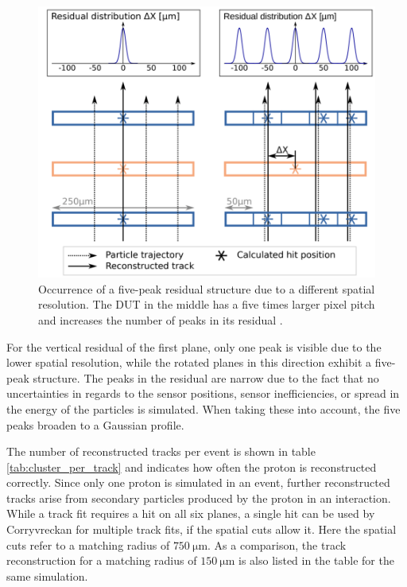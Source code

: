 \begin{figure}
  \centering
  \includegraphics[height=0.6\textwidth]{images/peaks.png}
  \caption{Occurrence of a five-peak residual structure due to a different spatial resolution. The DUT in the middle
  has a five times larger pixel pitch and increases the number of peaks in its residual \cite{peaks}.}
  \label{fig:peaks}
\end{figure}

For the vertical residual of the first plane, only one peak is visible due to the lower spatial resolution, while the rotated planes
in this direction exhibit a five-peak structure. The peaks in the residual are narrow due to the fact that no uncertainties in regards
to the sensor positions, sensor inefficiencies, or spread in the energy of the particles is simulated. When taking these into account, the
five peaks broaden to a Gaussian profile.

The number of reconstructed tracks per event is shown in table \ref{tab:cluster_per_track} and indicates how often the proton is
reconstructed correctly. Since only one proton is simulated in an event, further reconstructed tracks arise from secondary
particles produced by the proton in an interaction. While a track fit requires a hit on all six planes, a single hit can be used by
Corryvreckan for multiple track fits, if the spatial cuts allow it. Here the spatial cuts refer to a matching radius of $\SI{750}{\micro\meter}$.
As a comparison, the track reconstruction for a matching radius of $\SI{150}{\micro\meter}$ is also listed in the table for the same
simulation.

